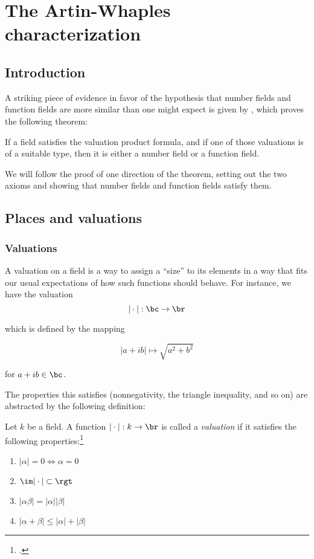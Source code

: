 \chapter{The Artin-Whaples characterization}
\section{Introduction}
\label{sec:orgheadline1}

A striking piece of evidence in favor of the hypothesis that number fields and
function fields are more similar than one might expect is given by
\cite{artinwhaples}, which proves the following theorem:

\begin{thm}
  \label{thm:maintheorem}
  If a field satisfies the valuation product formula, and if one of those
  valuations is of a suitable type, then it is either a number field or a
  function field.
\end{thm}

We will follow the proof of one direction of the theorem, setting out the two
axioms and showing that number fields and function fields satisfy them.

\section{Places and valuations}
\label{sec:orgheadline6}

\subsection{Valuations}
\label{sec:valuations}

A valuation on a field is a way to assign a ``size'' to its elements in a way
that fits our usual expectations of how such functions should behave. For
instance, we have the valuation
\[ |\cdot| : \bc \to \br \]

which is defined by the mapping

\[ |a + ib| \mapsto \sqrt{a^2 + b^2} \]

for $a+ib\in\bc$.

The properties this satisfies (nonnegativity, the triangle inequality, and so
on) are abstracted by the following definition:

\begin{defn}
  Let $k$ be a field. A function $|\cdot|: k\to\br$ is called a
  \textit{valuation} if it satisfies the following properties:\footcite[section
  1]{artinwhaples}
  \begin{enumerate}
  \item $|\alpha| = 0 \iff \alpha = 0$
  \item $\im |\cdot|\subset \rgt$
  \item $|\alpha\beta| = |\alpha||\beta|$
  \item $|\alpha + \beta| \leq |\alpha| + |\beta|$
  \end{enumerate}
\end{defn}

